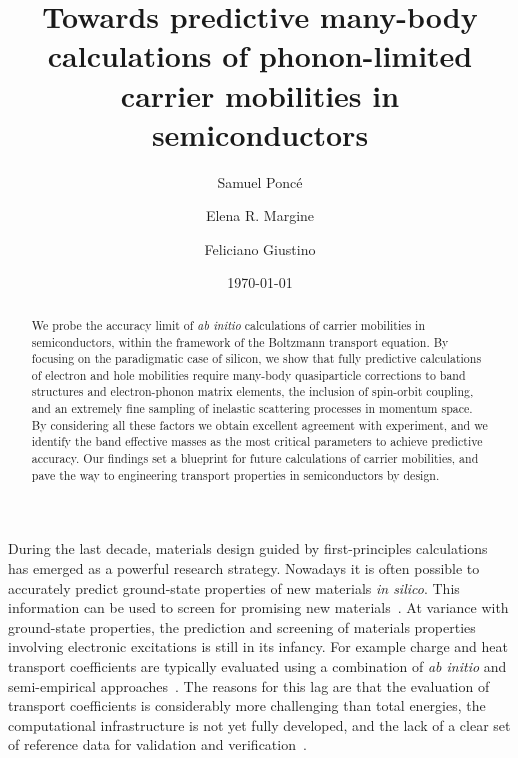 \documentclass[aps,prl,twocolumn,superscriptaddress]{revtex4-1}
\begin{document}
\title{Towards predictive many-body calculations of phonon-limited carrier mobilities in semiconductors}

\author{Samuel Ponc\'e}
\author{Elena R. Margine}
\author{Feliciano Giustino}

\newcommand{\mobun}{{cm$^2$/Vs}} 
\def\a{{\alpha}}
\def\b{{\beta}}
\def\ve{{\varepsilon}}
\def\w{\omega}
\def\bk{{\bf k}}
\def\bq{{\bf q}}
\def\bv{{\bf v}}
\def\bE{{\bf E}}
\def\bJ{{\bf J}}
\def\d{\delta}
\def\>{\rangle}
\def\<{\langle}
\def\D{\partial}
\def\kt{k_{\rm B}T}

\date{\today}

\begin{abstract}
We probe the accuracy limit of {\it ab initio} calculations of carrier mobilities in semiconductors,
within the framework of the Boltzmann transport equation. By focusing on the paradigmatic case of silicon,
we show that fully predictive calculations of electron and hole mobilities require many-body 
quasiparticle corrections to band structures and electron-phonon matrix elements, the inclusion 
of spin-orbit coupling, and an extremely fine sampling of inelastic scattering processes in momentum space.
By considering all these factors we obtain excellent agreement with experiment, and we identify the 
band effective masses as the most critical parameters to achieve predictive accuracy. Our findings 
set a blueprint for future calculations of carrier mobilities, and pave the way to engineering transport 
properties in semiconductors by design.
\end{abstract}

\maketitle


During the last decade, materials design guided by first-principles calculations has emerged 
as a powerful research strategy. Nowadays it is often possible 
to accurately predict ground-state properties of new materials {\it in silico}.
This information can be used to screen for promising new materials~\cite{Curtarolo2013,Jain2016}.
At variance with ground-state properties, the prediction and screening of materials properties involving 
electronic excitations is still in its infancy. For example charge and heat transport coefficients are 
typically evaluated using a combination of {\it ab initio} and semi-empirical approaches~\cite{Wang2011,Chen2013b,Hautier2013,Verstraete2014,Krishnaswamy2017}.
The reasons for this lag are that the evaluation of transport 
coefficients is considerably more challenging than total energies, the computational infrastructure is not 
yet fully developed, and the lack of a clear set of reference data for validation and verification~\cite{Lejaeghere2016}.
\end{document}
